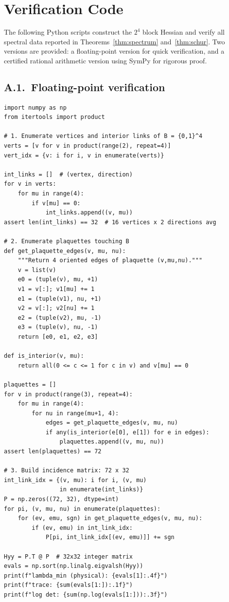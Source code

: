 \documentclass[11pt]{article}
\theoremstyle{definition}
\begin{document}
\section{Verification Code}\label{app:code}

The following Python scripts construct the $2^4$ block Hessian and
verify all spectral data reported in Theorems~\ref{thm:spectrum}
and~\ref{thm:schur}.  Two versions are provided: a floating-point
version for quick verification, and a certified rational arithmetic
version using SymPy for rigorous proof.

\subsection*{A.1.~Floating-point verification}

\begin{verbatim}
import numpy as np
from itertools import product

# 1. Enumerate vertices and interior links of B = {0,1}^4
verts = [v for v in product(range(2), repeat=4)]
vert_idx = {v: i for i, v in enumerate(verts)}

int_links = []  # (vertex, direction)
for v in verts:
    for mu in range(4):
        if v[mu] == 0:
            int_links.append((v, mu))
assert len(int_links) == 32  # 16 vertices x 2 directions avg

# 2. Enumerate plaquettes touching B
def get_plaquette_edges(v, mu, nu):
    """Return 4 oriented edges of plaquette (v,mu,nu)."""
    v = list(v)
    e0 = (tuple(v), mu, +1)
    v1 = v[:]; v1[mu] += 1
    e1 = (tuple(v1), nu, +1)
    v2 = v[:]; v2[nu] += 1
    e2 = (tuple(v2), mu, -1)
    e3 = (tuple(v), nu, -1)
    return [e0, e1, e2, e3]

def is_interior(v, mu):
    return all(0 <= c <= 1 for c in v) and v[mu] == 0

plaquettes = []
for v in product(range(3), repeat=4):
    for mu in range(4):
        for nu in range(mu+1, 4):
            edges = get_plaquette_edges(v, mu, nu)
            if any(is_interior(e[0], e[1]) for e in edges):
                plaquettes.append((v, mu, nu))
assert len(plaquettes) == 72

# 3. Build incidence matrix: 72 x 32
int_link_idx = {(v, mu): i for i, (v, mu)
                in enumerate(int_links)}
P = np.zeros((72, 32), dtype=int)
for pi, (v, mu, nu) in enumerate(plaquettes):
    for (ev, emu, sgn) in get_plaquette_edges(v, mu, nu):
        if (ev, emu) in int_link_idx:
            P[pi, int_link_idx[(ev, emu)]] += sgn

Hyy = P.T @ P  # 32x32 integer matrix
evals = np.sort(np.linalg.eigvalsh(Hyy))
print(f"lambda_min (physical): {evals[1]:.4f}")
print(f"trace: {sum(evals[1:]):.1f}")
print(f"log det: {sum(np.log(evals[1:])):.3f}")
\end{verbatim}
\end{document}
